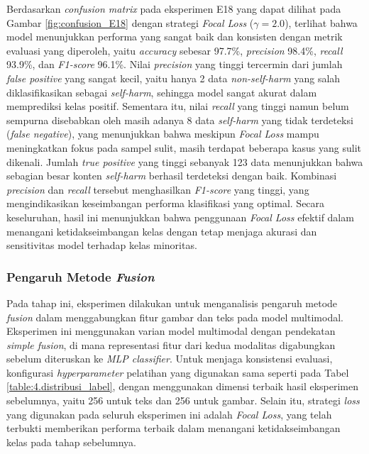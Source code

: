 Berdasarkan \textit{confusion matrix} pada eksperimen E18 yang dapat dilihat pada Gambar \ref{fig:confusion_E18} dengan strategi \textit{Focal Loss} ($\gamma = 2.0$), terlihat bahwa model menunjukkan performa yang sangat baik dan konsisten dengan metrik evaluasi yang diperoleh, yaitu \textit{accuracy} sebesar 97.7\%, \textit{precision} 98.4\%, \textit{recall} 93.9\%, dan \textit{F1-score} 96.1\%. Nilai \textit{precision} yang tinggi tercermin dari jumlah \textit{false positive} yang sangat kecil, yaitu hanya 2 data \textit{non-self-harm} yang salah diklasifikasikan sebagai \textit{self-harm}, sehingga model sangat akurat dalam memprediksi kelas positif. Sementara itu, nilai \textit{recall} yang tinggi namun belum sempurna disebabkan oleh masih adanya 8 data \textit{self-harm} yang tidak terdeteksi (\textit{false negative}), yang menunjukkan bahwa meskipun \textit{Focal Loss} mampu meningkatkan fokus pada sampel sulit, masih terdapat beberapa kasus yang sulit dikenali. Jumlah \textit{true positive} yang tinggi sebanyak 123 data menunjukkan bahwa sebagian besar konten \textit{self-harm} berhasil terdeteksi dengan baik. Kombinasi \textit{precision} dan \textit{recall} tersebut menghasilkan \textit{F1-score} yang tinggi, yang mengindikasikan keseimbangan performa klasifikasi yang optimal. Secara keseluruhan, hasil ini menunjukkan bahwa penggunaan \textit{Focal Loss} efektif dalam menangani ketidakseimbangan kelas dengan tetap menjaga akurasi dan sensitivitas model terhadap kelas minoritas.


\subsubsection{Pengaruh Metode \textit{Fusion}} \label{IV.Multimodal Fusion}
Pada tahap ini, eksperimen dilakukan untuk menganalisis pengaruh metode \textit{fusion} dalam menggabungkan fitur gambar dan teks pada model multimodal. Eksperimen ini menggunakan varian model multimodal dengan pendekatan \textit{simple fusion}, di mana representasi fitur dari kedua modalitas digabungkan sebelum diteruskan ke \textit{MLP classifier}. Untuk menjaga konsistensi evaluasi, konfigurasi \textit{hyperparameter} pelatihan yang digunakan sama seperti pada Tabel \ref{table:4.distribusi_label}, dengan menggunakan dimensi terbaik hasil eksperimen sebelumnya, yaitu 256 untuk teks dan 256 untuk gambar. Selain itu, strategi \textit{loss} yang digunakan pada seluruh eksperimen ini adalah \textit{Focal Loss}, yang telah terbukti memberikan performa terbaik dalam menangani ketidakseimbangan kelas pada tahap sebelumnya.

